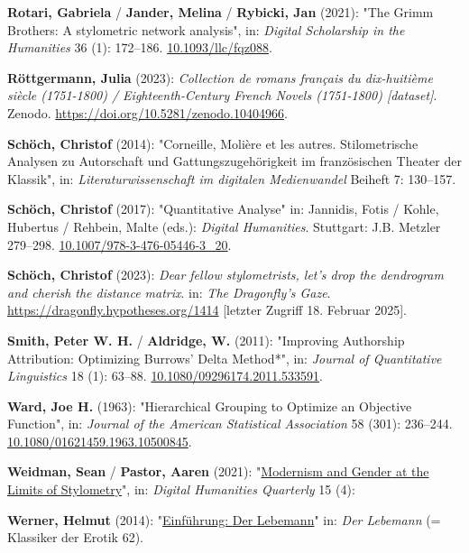 \documentclass[
  12pt,
  letterpaper,
  DIV=11,
  numbers=noendperiod]{scrreprt}
\newlength{\cslhangindent}
\newenvironment{CSLReferences}[2] %
 {\begin{list}{}{%
  \setlength{\itemindent}{0pt}
  \setlength{\leftmargin}{0pt}
  \setlength{\parsep}{0pt}
  \ifodd #1
   \setlength{\leftmargin}{\cslhangindent}
   \setlength{\itemindent}{-1\cslhangindent}
  \fi
  \setlength{\itemsep}{#2\baselineskip}}}
 {\end{list}}
\begin{document}
\begin{CSLReferences}{1}{0}
\textbf{Rotari, Gabriela} / \textbf{Jander, Melina} / \textbf{Rybicki,
Jan} (2021): "The {Grimm} {Brothers}: {A} stylometric network analysis",
in: \emph{Digital Scholarship in the Humanities} 36 (1): 172--186.
\href{https://doi.org/10.1093/llc/fqz088}{10.1093/llc/fqz088}.

\textbf{Röttgermann, Julia} (2023): \emph{Collection de romans français
du dix-huitième siècle (1751-1800) / {Eighteenth}-{Century} {French}
{Novels} (1751-1800) {[}dataset{]}}. Zenodo.
\url{https://doi.org/10.5281/zenodo.10404966}.

\textbf{Schöch, Christof} (2014): "Corneille, {Molière} et les autres.
{Stilometrische} {Analysen} zu {Autorschaft} und {Gattungszugehörigkeit}
im französischen {Theater} der {Klassik}", in:
\emph{Literaturwissenschaft im digitalen Medienwandel} Beiheft 7:
130--157.

\textbf{Schöch, Christof} (2017): "Quantitative {Analyse}" in: Jannidis,
Fotis / Kohle, Hubertus / Rehbein, Malte (eds.): \emph{Digital
{Humanities}}. Stuttgart: J.B. Metzler 279--298.
\href{https://doi.org/10.1007/978-3-476-05446-3_20}{10.1007/978-3-476-05446-3\_20}.

\textbf{Schöch, Christof} (2023): \emph{Dear fellow stylometrists, let's
drop the dendrogram and cherish the distance matrix}. in: \emph{The
Dragonfly's Gaze}. \url{https://dragonfly.hypotheses.org/1414}
{[}letzter Zugriff 18. Februar 2025{]}.

\textbf{Smith, Peter W. H.} / \textbf{Aldridge, W.} (2011): "Improving
{Authorship} {Attribution}: {Optimizing} {Burrows}' {Delta} {Method}*",
in: \emph{Journal of Quantitative Linguistics} 18 (1): 63--88.
\href{https://doi.org/10.1080/09296174.2011.533591}{10.1080/09296174.2011.533591}.

\textbf{Ward, Joe H.} (1963): "Hierarchical {Grouping} to {Optimize} an
{Objective} {Function}", in: \emph{Journal of the American Statistical
Association} 58 (301): 236--244.
\href{https://doi.org/10.1080/01621459.1963.10500845}{10.1080/01621459.1963.10500845}.

\textbf{Weidman, Sean} / \textbf{Pastor, Aaren} (2021):
"\href{https://www.digitalhumanities.org/dhq/vol/15/4/000566/000566.html}{Modernism
and {Gender} at the {Limits} of {Stylometry}}", in: \emph{Digital
Humanities Quarterly} 15 (4):

\textbf{Werner, Helmut} (2014):
"\href{https://seyerlein.de/shop/item/9783944964744/klassiker-der-erotik-62-der-lebemann-von-andrea-de-nerciat-e-book-epub}{Einführung:
{Der} {Lebemann}}" in: \emph{Der {Lebemann}} (= Klassiker der {Erotik}
62).

\end{CSLReferences}
\end{document}
